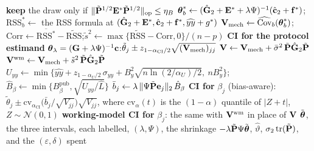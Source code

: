 \begin{algorithm}[p]
\begin{algorithmic}[1]
  \State \textbf{keep} the draw only if $\|\tilde{\mathbf{P}}^{1/2}\mathbf E^*\tilde{\mathbf{P}}^{1/2}\|_{\mathrm{op}}\le\eta_B$ 
  \State $\boldsymbol{\theta}^*_b\gets(\hat{\mathbf{G}}_2+\mathbf E^*+\lambda\Psi)^{-1}(\hat{\mathbf{c}}_2+\mathbf f^*)$;\quad $\mathrm{RSS}^*_b\gets$ the RSS formula at $(\hat{\mathbf{G}}_2+\mathbf E^*,\hat{\mathbf{c}}_2+\mathbf f^*,\widehat{yy}+g^*)$
\EndFor
\State $\mathbf{V}_{\mathrm{mech}}\gets\widehat{\mathrm{Cov}}_b(\boldsymbol{\theta}^*_b)$;\quad $\mathrm{Corr}\gets\overline{\mathrm{RSS}^*}-\widetilde{\mathrm{RSS}}$;\quad $\tilde s^2\gets\max\{\widetilde{\mathrm{RSS}}-\mathrm{Corr},0\}/(n-p)$
\State \textbf{CI for the protocol estimand} $\boldsymbol{\theta}_\lambda=(\mathbf{G}+\lambda\Psi)^{-1}\mathbf{c}$:\quad $\tilde\theta_j\pm z_{1-\alpha_{\mathrm{CI}}/2}\sqrt{(\mathbf{V}_{\mathrm{mech}})_{jj}}$
\State $\mathbf{V}\gets\mathbf{V}_{\mathrm{mech}}+\bar\sigma^2\,\tilde{\mathbf{P}}\hat{\mathbf{G}}_2\tilde{\mathbf{P}}$ 
\State $\mathbf{V}^{\mathrm{wm}}\gets\mathbf{V}_{\mathrm{mech}}+\tilde s^2\,\tilde{\mathbf{P}}\hat{\mathbf{G}}_2\tilde{\mathbf{P}}$ 
\State $U_{yy}\gets\min\bigl\{\widehat{yy}+z_{1-\alpha_U/2}\,\sigma_{yy}+B_y^2\sqrt{n\ln(2/\alpha_U)/2},\ nB_y^2\bigr\}$;\quad $\hat B_\beta\gets\min\{B_\beta^{\mathrm{pub}},\sqrt{U_{yy}/\hat L}\}$ 
\State $\bar b_j\gets\lambda\,\|\Psi\tilde{\mathbf{P}}\mathbf e_j\|_2\,\hat B_\beta$ 
\State \textbf{CI for} $\beta_j$ (bias-aware): $\tilde\theta_j\pm\mathrm{cv}_{\alpha_{\mathrm{CI}}}\bigl(\bar b_j/\sqrt{V_{jj}}\bigr)\sqrt{V_{jj}}$, where $\mathrm{cv}_\alpha(t)$ is the $(1-\alpha)$ quantile of $|Z+t|$, $Z\sim\mathcal N(0,1)$ 
\State \textbf{working-model CI for} $\beta_j$: the same with $\mathbf{V}^{\mathrm{wm}}$ in place of $\mathbf{V}$ 
\State \Return $\tilde{\boldsymbol{\theta}}$, the three intervals, each labelled, $(\lambda,\Psi)$, the shrinkage $-\lambda\tilde{\mathbf{P}}\Psi\tilde{\boldsymbol{\theta}}$, $\hat\vartheta$, $\sigma_2\operatorname{tr}(\tilde{\mathbf{P}})$, and the $(\varepsilon,\delta)$ spent
\end{algorithmic}
\end{algorithm}

